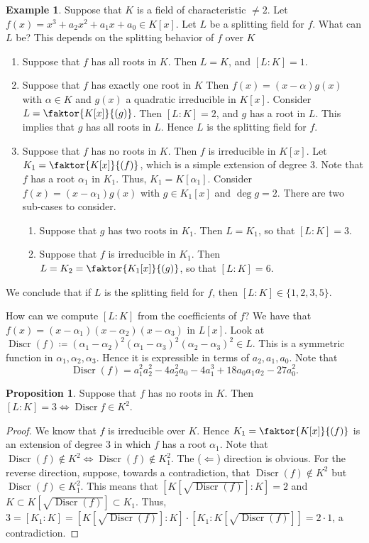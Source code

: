 \documentclass[10pt,letterpaper,cm]{nupset}
\theoremstyle{definition}
\newtheorem{exmp}[definition]{Example}
\theoremstyle{theorem}
\newtheorem{prop}[definition]{Proposition}
\theoremstyle{remark}
\newcommand{\1}{\mathbf{1}}
\newcommand{\0}{\vec 0}
\DeclareMathOperator{\disc}{Discr}
\begin{document}
\begin{exmp} 
Suppose that $K$ is a field of characteristic $\ne 2$. Let $f(x) = x^3 + a_2x^2 + a_1x + a_0 \in K[x]$. Let $L$ be a splitting field for $f$. What can $L$ be? This depends on the splitting behavior of $f$ over $K$
\begin{enumerate}
\item Suppose that $f$ has all roots in $K$. Then $L = K$, and $[L:K]=1$.
\item Suppose that $f$ has exactly one root in $K$ Then $f(x) = (x-\alpha)g(x)$ with $\alpha \in K$ and $g(x)$ a quadratic irreducible in $K[x]$. Consider $L = \faktor{K[x]}{(g)}$. Then $[L: K]=2$, and $g$ has a root in $L$. This implies that $g$ has all roots in $L$. Hence $L$ is the splitting field for $f$. 
\item Suppose that $f$ has no roots in $K$. Then $f$ is irreducible in $K[x]$. Let $K_1 = \faktor{K[x]}{(f)}$, which is a simple extension of degree $3$. Note that $f$ has a root $\alpha_1$ in $K_1$. Thus, $K_1 = K[\alpha_1]$. Consider $f(x) = (x -\alpha_1)g(x)$ with $g \in K_1[x]$ and $\deg{g} =2$. There are two sub-cases to consider.
\begin{enumerate}
\item Suppose that $g$ has two roots in $K_1$. Then $L= K_1$, so that $[L:K] =3$.
\item Suppose that $f$ is irreducible in $K_1$. Then $L= K_2 = \faktor{K_1[x]}{(g)}$, so that $[L:K] =6$.
\end{enumerate}
\end{enumerate}
We conclude that if $L$ is the splitting field for $f$, then $[L:K] \in \{1, 2, 3, 5\}$.

\medskip


How can we compute $[L:K]$ from the coefficients of $f$?
We have that $f(x) = (x- \alpha_1)(x-\alpha_2)(x-\alpha_3)$ in $L[x]$. Look at $\disc(f)\coloneqq  (\alpha_1 - \alpha_2)^2(\alpha_1 - \alpha_3)^2(\alpha_2 - \alpha_3)^2 \in L$. This is a symmetric function in $\alpha_1, \alpha_2, \alpha_3$. Hence it is expressible in terms of $a_2, a_1, a_0$. Note that $$\disc(f) = a_1^2a_2^2 -4a_2^2a_0 -4a_1^3 + 18 a_0a_1a_2 - 27a_0^2.$$
\begin{prop}
Suppose that $f$ has no roots in $K$. Then $[L:K] = 3 \iff \disc{f} \in K^2$.
\end{prop}
\begin{proof}
We know that $f$ is irreducible over $K$. Hence $K_1 = \faktor{K[x]}{(f)}$ is an extension of degree $3$ in which $f$ has a root $\alpha_1$. Note that $\disc(f) \notin K^2 \iff \disc(f) \notin K_1^2$. The ($\Longleftarrow$) direction is obvious. For the reverse direction, suppose, towards a contradiction, that $\disc(f) \notin K^2$ but $\disc(f) \in K_1^2$. This means that $[K[\sqrt{\disc(f)}] :K] = 2$ and $K\subset K[\sqrt{\disc(f)}] \subset K_1$. Thus, $3 = [K_1 : K] = [K[\sqrt{\disc(f)}] : K] \cdot [K_1 : K[\sqrt{\disc(f)}]] = 2 \cdot 1$, a contradiction. 


\end{proof}
\end{exmp}
\end{document}
